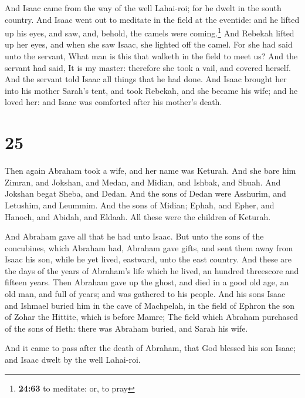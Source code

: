  And Isaac came from the way of the well Lahai-roi; for
he dwelt in the south country.  And Isaac went out to
meditate in the field at the eventide: and he lifted up his eyes, and
saw, and, behold, the camels were coming.\footnote{\textbf{24:63} to
  meditate: or, to pray}  And Rebekah lifted up her eyes,
and when she saw Isaac, she lighted off the camel.  For
she had said unto the servant, What man is this that walketh in the
field to meet us? And the servant had said, It is my master: therefore
she took a vail, and covered herself.  And the servant
told Isaac all things that he had done.  And Isaac
brought her into his mother Sarah's tent, and took Rebekah, and she
became his wife; and he loved her: and Isaac was comforted after his
mother's death.

\hypertarget{section-24}{%
\section{25}\label{section-24}}

 Then again Abraham took a wife, and her name was Keturah.
 And she bare him Zimran, and Jokshan, and Medan, and
Midian, and Ishbak, and Shuah.  And Jokshan begat Sheba,
and Dedan. And the sons of Dedan were Asshurim, and Letushim, and
Leummim.  And the sons of Midian; Ephah, and Epher, and
Hanoch, and Abidah, and Eldaah. All these were the children of Keturah.

 And Abraham gave all that he had unto Isaac.
 But unto the sons of the concubines, which Abraham had,
Abraham gave gifts, and sent them away from Isaac his son, while he yet
lived, eastward, unto the east country.  And these are the
days of the years of Abraham's life which he lived, an hundred
threescore and fifteen years.  Then Abraham gave up the
ghost, and died in a good old age, an old man, and full of years; and
was gathered to his people.  And his sons Isaac and
Ishmael buried him in the cave of Machpelah, in the field of Ephron the
son of Zohar the Hittite, which is before Mamre;  The
field which Abraham purchased of the sons of Heth: there was Abraham
buried, and Sarah his wife.

 And it came to pass after the death of Abraham, that God
blessed his son Isaac; and Isaac dwelt by the well Lahai-roi.

